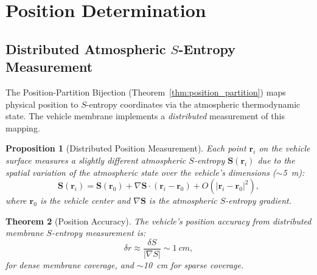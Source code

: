 \documentclass[twocolumn,10pt]{article}
\newtheorem{theorem}{Theorem}[section]
\newtheorem{proposition}[theorem]{Proposition}
\theoremstyle{definition}
\theoremstyle{remark}
\begin{document}
\section{Position Determination}
\label{sec:position}

\subsection{Distributed Atmospheric $S$-Entropy Measurement}

The Position-Partition Bijection (Theorem~\ref{thm:position_partition}) maps physical position to $S$-entropy coordinates via the atmospheric thermodynamic state. The vehicle membrane implements a \emph{distributed} measurement of this mapping.

\begin{proposition}[Distributed Position Measurement]
\label{prop:distributed_position}
Each point $\mathbf{r}_i$ on the vehicle surface measures a slightly different atmospheric $S$-entropy $\mathbf{S}(\mathbf{r}_i)$ due to the spatial variation of the atmospheric state over the vehicle's dimensions ($\sim$\SI{5}{m}):
\begin{equation}
  \mathbf{S}(\mathbf{r}_i) = \mathbf{S}(\mathbf{r}_0) + \nabla\mathbf{S} \cdot (\mathbf{r}_i - \mathbf{r}_0) + O(|\mathbf{r}_i - \mathbf{r}_0|^2),
  \label{eq:distributed_s}
\end{equation}
where $\mathbf{r}_0$ is the vehicle center and $\nabla\mathbf{S}$ is the atmospheric $S$-entropy gradient.
\end{proposition}

\begin{theorem}[Position Accuracy]
\label{thm:position_accuracy}
The vehicle's position accuracy from distributed membrane $S$-entropy measurement is:
\begin{equation}
  \delta r \approx \frac{\delta S}{|\nabla S|} \sim \SI{1}{cm},
  \label{eq:position_accuracy}
\end{equation}
for dense membrane coverage, and $\sim$\SI{10}{cm} for sparse coverage.
\end{theorem}
\end{document}

